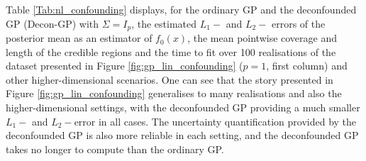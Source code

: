 \documentclass[11pt]{article}
\begin{document}
Table \ref{Tab:nl_confounding} displays, for the ordinary GP and the deconfounded GP (Decon-GP) with $\Sigma = I_p$, the estimated $L_1-$ and $L_2-$ errors of the posterior mean as an estimator of $f_0(x)$, the mean pointwise coverage and length of the credible regions and the time to fit over 100 realisations of the dataset presented in Figure \ref{fig:gp_lin_confounding} ($p = 1$, first column) and other higher-dimensional scenarios. One can see that the story presented in Figure \ref{fig:gp_lin_confounding} generalises to many realisations and also the higher-dimensional settings, with the deconfounded GP providing a much smaller $L_1-$ and $L_2-$error in all cases. The uncertainty quantification provided by the deconfounded GP is also more reliable in each setting, and the deconfounded GP takes no longer to compute than the ordinary GP.
\end{document}
